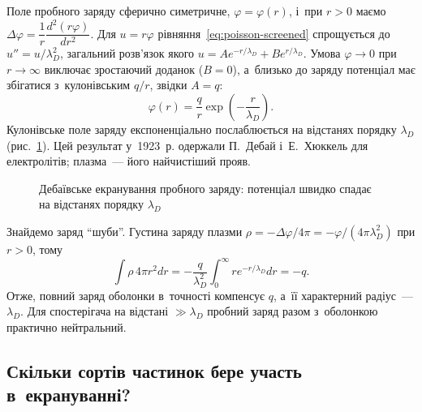 Поле пробного заряду сферично симетричне, $\varphi=\varphi(r)$, і~при $r>0$ маємо
$\Delta\varphi=\dfrac1r\dfrac{d^2(r\varphi)}{dr^2}$. Для $u=r\varphi$
рівняння~\eqref{eq:poisson-screened} спрощується до $u''=u/\lambda_D^2$, загальний
розв'язок якого $u=Ae^{-r/\lambda_D}+Be^{r/\lambda_D}$. Умова $\varphi\to0$ при
$r\to\infty$ виключає зростаючий доданок ($B=0$), а~близько до заряду потенціал має
збігатися з~кулонівським $q/r$, звідки $A=q$:
\begin{equation}\label{eq:screened-potential}
	\varphi(r)=\frac qr\exp\left(-\frac r{\lambda_D}\right).
\end{equation}
Кулонівське поле заряду експоненціально послаблюється на відстанях порядку $\lambda_D$
(рис.~\ref{pic:debye-screening}). Цей результат у~1923~р. одержали П.~Дебай і~Е.~Хюккель
для електролітів; плазма~--- його найчистіший прояв.

\begin{figure}[h!]\centering
	\caption{Дебаївське екранування пробного заряду: потенціал швидко спадає на відстанях
	порядку $\lambda_D$}
	\label{pic:debye-screening}
\end{figure}

Знайдемо заряд \enquote{шуби}. Густина заряду плазми
$\rho=-\Delta\varphi/4\pi=-\varphi/(4\pi\lambda_D^2)$ при $r>0$, тому
\begin{equation*}
	\int\rho\,4\pi r^2dr=-\frac q{\lambda_D^2}\int_0^\infty re^{-r/\lambda_D}dr=-q.
\end{equation*}
Отже, повний заряд оболонки в~точності компенсує $q$, а~її характерний радіус~---
$\lambda_D$. Для спостерігача на відстані $\gg\lambda_D$ пробний заряд разом з~оболонкою
практично нейтральний.



\subsection{Скільки сортів частинок бере участь в~екрануванні?}



